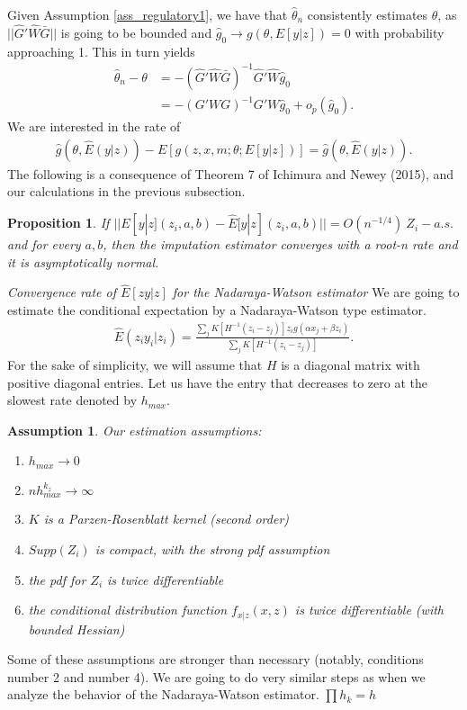 \documentclass{article}
\newtheorem{assumption}{Assumption}
\newtheorem{proposition}{Proposition}
\theoremstyle{definition}
\theoremstyle{remark}
\begin{document}
Given Assumption \ref{ass_regulatory1}, we have that $\hat{\theta}_n$ consistently estimates $\theta$, as $||\hat{G}'\hat{W}\bar{G}||$ is going to be bounded and $\hat{g}_0 \rightarrow g(\theta, E[y|z])=0$ with probability approaching 1. This in turn yields
\begin{align}
    \hat{\theta}_n -\theta&=-(\hat{G}'\hat{W}\bar{G})^{-1} \hat{G}'\hat{W} \hat{g}_0 \\
    &= -(G'WG)^{-1}G'W \hat{g}_0 + o_p(\hat{g}_0).\nonumber
\end{align}
We are interested in the rate of
\begin{align}
    \hat{g}(\theta, \hat{E}(y|z))-E[g(z,x,m; \theta; E[y|z])] = \hat{g}(\theta, \hat{E}(y|z)).
\end{align}
The following is a consequence of Theorem 7 of Ichimura and Newey (2015), and our calculations in the previous subsection.

\begin{proposition}
	If $||E[y|z](z_i, a,b)-\hat{E}[y|z](z_i, a,b)||=O(n^{-1/4}) \ Z_i-a.s.$ and for every $a,b$, then the imputation estimator converges with a root-n rate and it is asymptotically normal. 
\end{proposition}

\emph{Convergence rate of $\hat{E}[zy|z]$ for the Nadaraya-Watson estimator}
We are going to estimate the conditional expectation by a Nadaraya-Watson type estimator.
\begin{align}
    \hat{E}(z_iy_i|z_i)= \frac{\sum_j K[H^{-1}(z_i-z_j)] z_i g(\alpha x_j + \beta z_i)}{\sum_j K[H^{-1}(z_i-z_j)]}.
\end{align}
For the sake of simplicity, we will assume that $H$ is a diagonal matrix with positive diagonal entries. Let us have the entry that decreases to zero at the slowest rate denoted by $h_{max}$.

\begin{assumption}\label{ass_estimation}
    Our estimation assumptions:
    \begin{enumerate}
        \item $h_{max}\rightarrow 0$
        \item $nh_{max}^{k_z}\rightarrow \infty$
        \item $K$ is a Parzen-Rosenblatt kernel (second order)
        \item $Supp(Z_i)$ is compact, with the strong pdf assumption
        \item the pdf for $Z_i$ is twice differentiable
        \item the conditional distribution function $f_{x|z}(x,z)$ is twice differentiable (with bounded Hessian)
    \end{enumerate}
\end{assumption}
Some of these assumptions are stronger than necessary (notably, conditions number 2 and number 4).
We are going to do very similar steps as when we analyze the behavior of the Nadaraya-Watson estimator. $\prod h_k= h$ 
\end{document}
